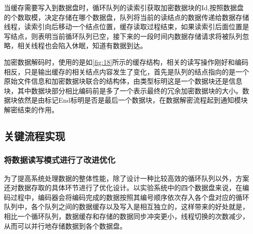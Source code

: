 当缓存需要写入到数据盘时，循环队列的读索引获取加密数据块的Id,按照数据盘的个数取模，决定存储在哪个数据盘，队列将当前的读结点的数据传递给数据存储线程，读索引向后移动一个结点位置，缓存读取过程结束，如果读索引后面位置是写结点，则表明当前循环队列已空，接下来的一段时间内数据存储请求将被队列忽略，相关线程也会陷入休眠，知道有数据到达。


加密数据解码时，使用的是如\autoref{fig:18}所示的缓存结构，相关的读写操作刚好和编码相反，只是输出缓存的相关结点内容发生了变化，首先是队列的结点指向的是一个原始文件信息和加密数据块联合的结构体，由类型标明这是一个数据块还是信息块，其中数据块部分相比编码前是多了一个表示最终的冗余加密数据块的大小。数据块依然是由标记End标明是否是最后一个数据块，在数据解密流程起到通知模块解密结束的作用。
\subsection{关键流程实现}
\subsubsection{将数据读写模式进行了改进优化}
为了提高系统处理数据的整体性能，除了设计一种比较高效的循环队列以外，方案还对数据存取的具体环节进行了优化设计。以实验系统中的四个数据盘来说，在编码过程中，编码器会将编码完成的数据按照其编号顺序依次存入各个盘对应的循环队列中，各个队列之间的数据缓存以及写入是相互独立的，这样带来的好处就是，相比一个循环队列，数据缓存和存储的数据同步冲突更小，线程切换的次数减少，从而可以并行地存储数据到各个数据盘。


